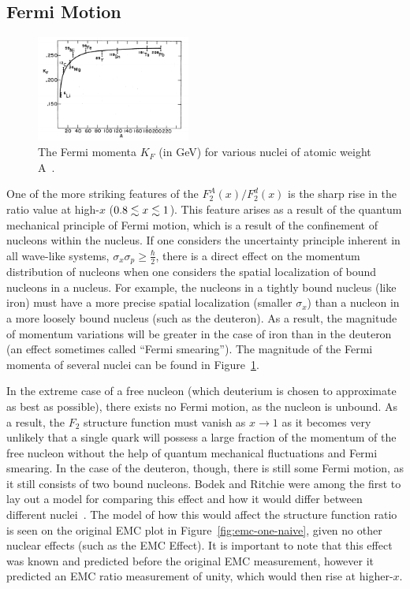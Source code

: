 \subsection{Fermi Motion}

\begin{figure}
	\centering
	\includegraphics[width=0.45\textwidth]{figures/background/fermi-momentum.png}
	\caption{The Fermi momenta $K_F$ (in GeV) for various nuclei of atomic weight A~\cite{PhysRevD.23.1070}.}
	\vspace{-20pt}
	\label{fig:fermi-momentum}
\end{figure}
One of the more striking features of the $F_2^A(x)/F_2^d(x)$ is the sharp rise in the ratio value at high-$x$ ($0.8\nobreak\lesssim\nobreak x\nobreak\lesssim\nobreak1$). This feature arises as a result of the quantum mechanical principle of Fermi motion, which is a result of the confinement of nucleons within the nucleus. If one considers the uncertainty principle inherent in all wave-like systems, $\sigma_x \sigma_p \geq \frac{\hbar}{2}$, there is a direct effect on the momentum distribution of nucleons when one considers the spatial localization of bound nucleons in a nucleus. For example, the nucleons in a tightly bound nucleus (like iron) must have a more precise spatial localization (smaller $\sigma_x$) than a nucleon in a more loosely bound nucleus (such as the deuteron). As a result, the magnitude of momentum variations will be greater in the case of iron than in the deuteron (an effect sometimes called ``Fermi smearing''). The magnitude of the Fermi momenta of several nuclei can be found in Figure~\ref{fig:fermi-momentum}.

In the extreme case of a free nucleon (which deuterium is chosen to approximate as best as possible), there exists no Fermi motion, as the nucleon is unbound. As a result, the $F_2$ structure function must vanish as $x\rightarrow1$ as it becomes very unlikely that a single quark will possess a large fraction of the momentum of the free nucleon without the help of quantum mechanical fluctuations and Fermi smearing. In the case of the deuteron, though, there is still some Fermi motion, as it still consists of two bound nucleons. Bodek and Ritchie were among the first to lay out a model for comparing this effect and how it would differ between different nuclei~\cite{PhysRevD.23.1070}.  The model of how this would affect the structure function ratio is seen on the original EMC plot in Figure~\ref{fig:emc-one-naive}, given no other nuclear effects (such as the EMC Effect). It is important to note that this effect was known and predicted before the original EMC measurement, however it predicted an EMC ratio measurement of unity, which would then rise at higher-$x$.

